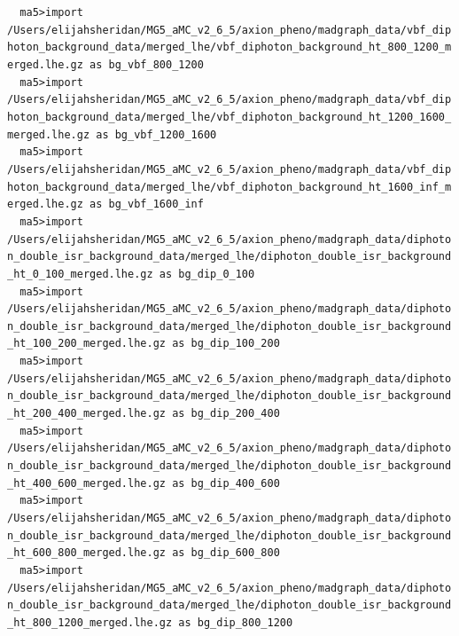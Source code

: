 \documentclass[a4paper, 10pt]{article}
\begin{document}
\texttt{ }\texttt{ }\texttt{ma5>import /\-Users/\-elijahsheridan/\-MG5\_aMC\_v2\_6\_5/\-axion\_pheno/\-madgraph\_data/\-vbf\_diphoton\_background\_data/\-merged\_lhe/\-vbf\_diphoton\_background\_ht\_800\_1200\_merged.lhe.gz as bg\_vbf\_800\_1200\\
}
\texttt{ }\texttt{ }\texttt{ma5>import /\-Users/\-elijahsheridan/\-MG5\_aMC\_v2\_6\_5/\-axion\_pheno/\-madgraph\_data/\-vbf\_diphoton\_background\_data/\-merged\_lhe/\-vbf\_diphoton\_background\_ht\_1200\_1600\_merged.lhe.gz as bg\_vbf\_1200\_1600\\
}
\texttt{ }\texttt{ }\texttt{ma5>import /\-Users/\-elijahsheridan/\-MG5\_aMC\_v2\_6\_5/\-axion\_pheno/\-madgraph\_data/\-vbf\_diphoton\_background\_data/\-merged\_lhe/\-vbf\_diphoton\_background\_ht\_1600\_inf\_merged.lhe.gz as bg\_vbf\_1600\_inf\\
}
\texttt{ }\texttt{ }\texttt{ma5>import /\-Users/\-elijahsheridan/\-MG5\_aMC\_v2\_6\_5/\-axion\_pheno/\-madgraph\_data/\-diphoton\_double\_isr\_background\_data/\-merged\_lhe/\-diphoton\_double\_isr\_background\_ht\_0\_100\_merged.lhe.gz as bg\_dip\_0\_100\\
}
\texttt{ }\texttt{ }\texttt{ma5>import /\-Users/\-elijahsheridan/\-MG5\_aMC\_v2\_6\_5/\-axion\_pheno/\-madgraph\_data/\-diphoton\_double\_isr\_background\_data/\-merged\_lhe/\-diphoton\_double\_isr\_background\_ht\_100\_200\_merged.lhe.gz as bg\_dip\_100\_200\\
}
\texttt{ }\texttt{ }\texttt{ma5>import /\-Users/\-elijahsheridan/\-MG5\_aMC\_v2\_6\_5/\-axion\_pheno/\-madgraph\_data/\-diphoton\_double\_isr\_background\_data/\-merged\_lhe/\-diphoton\_double\_isr\_background\_ht\_200\_400\_merged.lhe.gz as bg\_dip\_200\_400\\
}
\texttt{ }\texttt{ }\texttt{ma5>import /\-Users/\-elijahsheridan/\-MG5\_aMC\_v2\_6\_5/\-axion\_pheno/\-madgraph\_data/\-diphoton\_double\_isr\_background\_data/\-merged\_lhe/\-diphoton\_double\_isr\_background\_ht\_400\_600\_merged.lhe.gz as bg\_dip\_400\_600\\
}
\texttt{ }\texttt{ }\texttt{ma5>import /\-Users/\-elijahsheridan/\-MG5\_aMC\_v2\_6\_5/\-axion\_pheno/\-madgraph\_data/\-diphoton\_double\_isr\_background\_data/\-merged\_lhe/\-diphoton\_double\_isr\_background\_ht\_600\_800\_merged.lhe.gz as bg\_dip\_600\_800\\
}
\texttt{ }\texttt{ }\texttt{ma5>import /\-Users/\-elijahsheridan/\-MG5\_aMC\_v2\_6\_5/\-axion\_pheno/\-madgraph\_data/\-diphoton\_double\_isr\_background\_data/\-merged\_lhe/\-diphoton\_double\_isr\_background\_ht\_800\_1200\_merged.lhe.gz as bg\_dip\_800\_1200\\
}
\end{document}
